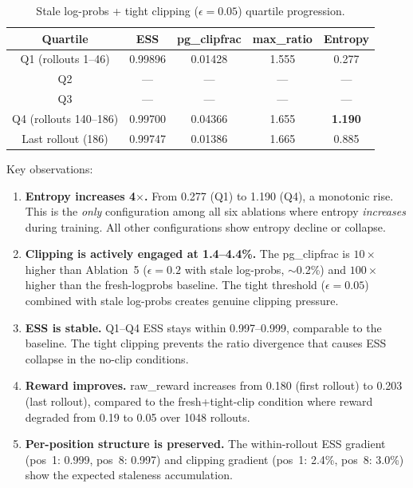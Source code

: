 \documentclass[11pt,a4paper]{article}
\begin{document}
\begin{table}[H]
\centering
\caption{Stale log-probs + tight clipping ($\epsilon = 0.05$) quartile progression.}
\label{tab:stale_clip_quartiles}
\begin{tabular}{@{}ccccc@{}}
\toprule
\textbf{Quartile} & \textbf{ESS} & \textbf{pg\_clipfrac} & \textbf{max\_ratio} & \textbf{Entropy} \\
\midrule
Q1 (rollouts 1--46) & 0.99896 & 0.01428 & 1.555 & 0.277 \\
Q2 & --- & --- & --- & --- \\
Q3 & --- & --- & --- & --- \\
Q4 (rollouts 140--186) & 0.99700 & 0.04366 & 1.655 & \textbf{1.190} \\
\midrule
Last rollout (186) & 0.99747 & 0.01386 & 1.665 & 0.885 \\
\bottomrule
\end{tabular}
\end{table}

Key observations:

\begin{enumerate}[leftmargin=*]
  \item \textbf{Entropy increases 4$\times$.} From 0.277 (Q1) to 1.190 (Q4),
    a monotonic rise. This is the \emph{only} configuration among all six
    ablations where entropy \emph{increases} during training. All other
    configurations show entropy decline or collapse.

  \item \textbf{Clipping is actively engaged at 1.4--4.4\%.} The pg\_clipfrac
    is $10\times$ higher than Ablation~5 ($\epsilon = 0.2$ with stale
    log-probs, $\sim$0.2\%) and $100\times$ higher than the fresh-logprobs
    baseline. The tight threshold ($\epsilon = 0.05$) combined with
    stale log-probs creates genuine clipping pressure.

  \item \textbf{ESS is stable.} Q1--Q4 ESS stays within 0.997--0.999,
    comparable to the baseline. The tight clipping prevents the
    ratio divergence that causes ESS collapse in the no-clip conditions.

  \item \textbf{Reward improves.} raw\_reward increases from 0.180 (first
    rollout) to 0.203 (last rollout), compared to the fresh+tight-clip
    condition where reward degraded from 0.19 to 0.05 over 1048 rollouts.

  \item \textbf{Per-position structure is preserved.} The within-rollout
    ESS gradient (pos~1: 0.999, pos~8: 0.997) and clipping gradient
    (pos~1: 2.4\%, pos~8: 3.0\%) show the expected staleness accumulation.
\end{enumerate}
\end{document}
